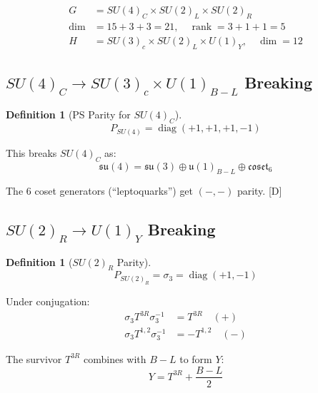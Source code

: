 \documentclass[11pt,a4paper]{article}
\newtheorem{definition}[theorem]{Definition}
\newcommand{\tagD}{\textcolor{blue!70!black}{[D]}}
\DeclareMathOperator{\diag}{diag}
\DeclareMathOperator{\rank}{rank}
\begin{document}
\begin{align}
\label{eq:ps-group}
G &= SU(4)_C \times SU(2)_L \times SU(2)_R \\
\label{eq:ps-dim}
\dim &= 15 + 3 + 3 = 21, \quad \rank = 3 + 1 + 1 = 5 \\
\label{eq:ps-target}
H &= SU(3)_c \times SU(2)_L \times U(1)_Y, \quad \dim = 12
\end{align}

\subsection{$SU(4)_C \to SU(3)_c \times U(1)_{B-L}$ Breaking}

\begin{definition}[PS Parity for $SU(4)_C$]
\label{def:ps-parity}
\begin{equation}
\label{eq:ps-P-su4}
P_{SU(4)} = \diag(+1, +1, +1, -1)
\end{equation}
\end{definition}

This breaks $SU(4)_C$ as:
\begin{equation}
\label{eq:su4-breaking}
\mathfrak{su}(4) = \mathfrak{su}(3) \oplus \mathfrak{u}(1)_{B-L} \oplus \mathfrak{coset}_6
\end{equation}

The 6 coset generators (``leptoquarks'') get $(-,-)$ parity. \tagD

\subsection{$SU(2)_R \to U(1)_Y$ Breaking}

\begin{definition}[$SU(2)_R$ Parity]
\label{def:ps-su2r-parity}
\begin{equation}
\label{eq:ps-P-su2r}
P_{SU(2)_R} = \sigma_3 = \diag(+1, -1)
\end{equation}
\end{definition}

Under conjugation:
\begin{align}
\label{eq:su2r-T3}
\sigma_3 T^{3R} \sigma_3^{-1} &= T^{3R} \quad (+) \\
\label{eq:su2r-T12}
\sigma_3 T^{1,2} \sigma_3^{-1} &= -T^{1,2} \quad (-)
\end{align}

The survivor $T^{3R}$ combines with $B-L$ to form $Y$:
\begin{equation}
\label{eq:ps-Y}
\boxed{Y = T^{3R} + \frac{B-L}{2}}
\end{equation}
\end{document}
